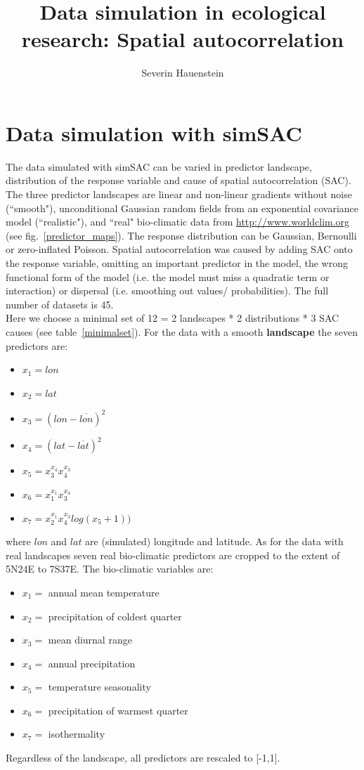\documentclass{article}
\author[]{Severin Hauenstein}
\affil[]{Department of Biometry and Environmental System Analysis, University of Freiburg, 79106 Freiburg, Germany}
\title{Data simulation in ecological research: Spatial autocorrelation}
\begin{document}
\maketitle
\section{Data simulation with \textsf{simSAC}}
The data simulated with \textsf{simSAC} can be varied in predictor landscape, distribution of the response variable and cause of spatial autocorrelation (SAC). The three predictor landscapes are linear and non-linear gradients without noise (``smooth"), unconditional Gaussian random fields from an exponential covariance model (``realistic"), and ``real" bio-climatic data from \url{http://www.worldclim.org} (see fig.~\ref{predictor_maps}). 
The response distribution can be Gaussian, Bernoulli or zero-inflated Poisson. Spatial autocorrelation was caused by adding SAC onto the response variable, omitting an important predictor in the model, the wrong functional form of the model (i.e. the model must miss a quadratic term or interaction) or dispersal (i.e. smoothing out values/ probabilities). The full number of datasets is 45.\\

Here we choose a minimal set of 12 =  2 landscapes * 2 distributions * 3 SAC causes (see table~\ref{minimalset}).
For the data with a smooth \textbf{landscape} the seven predictors are: 
\begin{itemize}
	\setlength\itemsep{-0.2em}
	\item $x_1 = lon$
	\item $x_2 = lat$
	\item $x_3 = (lon - \overline{lon})^2$
	\item $x_4 = (lat - \overline{lat})^2$
	\item $x_5 = x_3^{x_4}x_4^{x_3}$
	\item $x_6 = x_1^{x_1}x_3^{x_4}$
	\item $x_7 = x_2^{x_1}x_4^{x_3}log(x_5 + 1))$
\end{itemize}
where $lon$ and $lat$ are (simulated) longitude and latitude. As for the data with real landscapes seven real bio-climatic predictors are cropped to the extent of 5N24E to 7S37E. The bio-climatic variables are: 
\begin{itemize}
	\setlength\itemsep{-0.2em}
	\item $x_1 =$ annual mean temperature
	\item $x_2 =$ precipitation of coldest quarter
	\item $x_3 =$ mean diurnal range
	\item $x_4 =$ annual precipitation
	\item $x_5 =$ temperature seasonality
	\item $x_6 =$ precipitation of warmest quarter
	\item $x_7 =$ isothermality
\end{itemize}
Regardless of the landscape, all predictors are rescaled to [-1,1].\\
\end{document}
